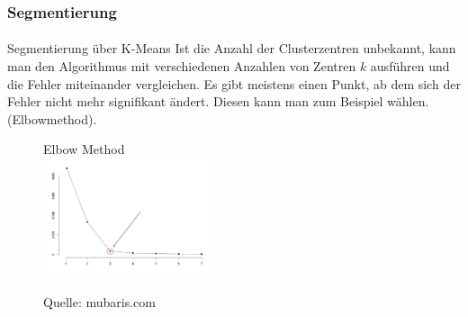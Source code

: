 \documentclass{beamer}
\begin{document}
\begin{frame}
    \frametitle{Segmentierung}
\framesubtitle{}
\begin{block}{Segmentierung über K-Means}
Ist die Anzahl der Clusterzentren unbekannt, kann man den Algorithmus mit verschiedenen Anzahlen von Zentren $k$ ausführen und die 
Fehler miteinander vergleichen. Es gibt meistens einen Punkt, ab dem sich der Fehler nicht mehr signifikant ändert. Diesen kann man zum Beispiel wählen.
(Elbowmethod). 
\end{block}

\begin{figure}[htp]
      \centering
Elbow Method \\
    \includegraphics[width=0.45\textwidth]{img/kmeans_elbow} 
      \caption{Quelle:  mubaris.com}
\end{figure}

 \end{frame}
\end{document}
